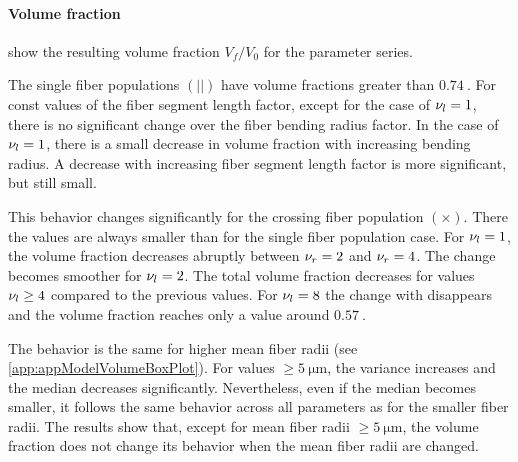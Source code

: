 \paragraph{Volume fraction}
% 
 show the resulting volume fraction $V_f/V_0$ for the parameter series.
\par
% 
The single fiber populations $(||)$ have volume fractions greater than $\SI{0.74}{}$.
For const values of the fiber segment length factor, except for the case of $\textnormal{$\nu_{l}$} = \SI{1}{}$, there is no significant change over the fiber bending radius factor.
In the case of $\textnormal{$\nu_{l}$} = \SI{1}{}$, there is a small decrease in volume fraction with increasing bending radius.
A decrease with increasing fiber segment length factor \segLengthFactor{} is more significant, but still small.
\par
% 
This behavior changes significantly for the crossing fiber population $(\times)$.
There the values are always smaller than for the single fiber population case.
For $\textnormal{$\nu_{l}$}{}=\SI{1}{}$, the volume fraction decreases abruptly between $\textnormal{$\nu_{r}$}{} = \SI{2}{}$ and $\textnormal{$\nu_{r}$}{} = \SI{4}{}$. 
The change becomes smoother for $\textnormal{$\nu_{l}$}{}=\SI{2}{}$.
The total volume fraction decreases for values $\textnormal{$\nu_{l}$}{} \geq \SI{4}{}$ compared to the previous values.
For $\textnormal{$\nu_{l}$}{}=\SI{8}{}$ the change with \segRadiusFactor{} disappears and the volume fraction reaches only a value around $\SI{0.57}{}$.
\par
% 
The behavior is the same for higher mean fiber radii (see \cref{app:appModelVolumeBoxPlot}). For values $\geq \SI{5}{\micro\meter}$, the variance increases and the median decreases significantly.
Nevertheless, even if the median becomes smaller, it follows the same behavior across all parameters as for the smaller fiber radii.
The results show that, except for mean fiber radii $\geq \SI{5}{\micro\meter}$, the volume fraction does not change its behavior when the mean fiber radii are changed.
\par
% 
% 
% 

